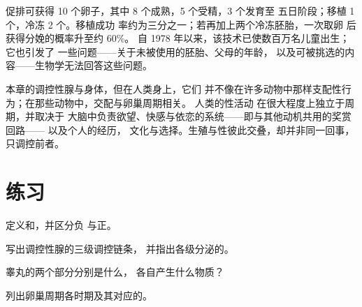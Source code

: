 \begin{example}[一次尝试中的数字]\label{ex:g11:hormones-and-reproduction:ivf}
促排可获得 10 个卵子，其中 8 个成熟，5 个受精，3 个发育至
五日阶段；移植 1 个，冷冻 2 个。移植成功
率约为三分之一；若再加上两个冷冻胚胎，一次取卵
后获得分娩的概率升至约 60\%。
自 1978 年以来，该技术已使数百万名儿童出生；它也引发了
一些问题——关于未被使用的胚胎、父母的年龄，
以及可被挑选的内容——生物学无法回答这些问题。
\end{example}

\begin{remark}[相互交汇的两个系统]\label{rem:g11:hormones-and-reproduction:brain}
本章的调控性腺与身体，但在人类身上，它们
并不像在许多动物中那样支配性行为；在那些动物中，交配与卵巢周期相关。
人类的性活动
在很大程度上独立于周期，并取决于
大脑中负责欲望、快感与依恋的系统——即与其他动机共用的奖赏回路——
以及个人的经历，
文化与选择。生殖与性彼此交叠，却并非同一回事，
只调控前者。
\end{remark}

\section{练习}

\begin{exercise}[$\star$]\label{exo:g11:hormones-and-reproduction:1}
定义和，并区分负
与正。
\end{exercise}

\begin{exercise}[$\star$]\label{exo:g11:hormones-and-reproduction:2}
写出调控性腺的三级调控链条，
并指出各级分泌的。
\end{exercise}

\begin{exercise}[$\star$]\label{exo:g11:hormones-and-reproduction:3}
睾丸的两个部分分别是什么，
各自产生什么物质？
\end{exercise}

\begin{exercise}[$\star$]\label{exo:g11:hormones-and-reproduction:4}
列出卵巢周期各时期及其对应的。
\end{exercise}

